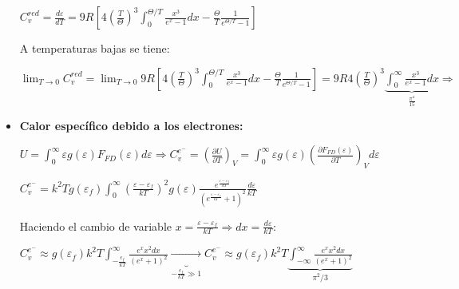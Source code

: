 \documentclass[oneside]{book}
\numberwithin{equation}{section}
\numberwithin{figure}{section}
\numberwithin{table}{section}
\begin{document}
\begin{itemize}
				\begin{center}
					$\displaystyle C_v^{red}=\frac{d\varepsilon}{dT}=9R\left[4\left(\frac{T}{\Theta}\right)^3\int_0^{\Theta/T} \frac{x^3}{e^x-1}dx-\frac{\Theta}{T}\frac{1}{e^{\Theta/T}-1}\right]$
				\end{center}
		
				A temperaturas bajas se tiene:
			
				\begin{center}
					$\displaystyle \lim_{T \to 0} C_v^{red}=\lim_{T \to 0} 9R\left[4\left(\frac{T}{\Theta}\right)^3\int_0^{\Theta/T} \frac{x^3}{e^x-1}dx-\frac{\Theta}{T}\frac{1}{e^{\Theta/T}-1}\right]=9R4\left(\frac{T}{\Theta}\right)^3 \underbrace{\int_0^{\infty} \frac{x^3}{e^x-1}dx}_{\frac{\pi^4}{15}} \Rightarrow$
				\end{center}
		
				\begin{center}
				\end{center}
		
				\item \textbf{Calor específico debido a los electrones:}\\
				
				\begin{center}
					$\displaystyle U=\int_0^{\infty} \varepsilon g(\varepsilon)F_{FD}(\varepsilon) d\varepsilon \Rightarrow C_v^{e^-}=\left( \frac{\partial U}{\partial T}\right)_V=\int_0^{\infty} \varepsilon g(\varepsilon)\left(\frac{\partial F_{FD}(\varepsilon)}{\partial T}\right)_V d\varepsilon$
				\end{center}
				
				\begin{center}
					$\displaystyle C_v^{e^-}=k^2T g(\varepsilon_f)\int_0^{\infty} \left(\frac{\varepsilon-\varepsilon_f}{kT}\right)^2 g(\varepsilon)\frac{e^{\frac{\varepsilon-\varepsilon_f}{kT}}}{\left(e^{\frac{\varepsilon-\varepsilon_f}{kT}}+1\right)^2} \frac{d\varepsilon}{kT}$
				\end{center}
		
				Haciendo el cambio de variable $x=\frac{\varepsilon-\varepsilon_f}{kT} \Rightarrow dx=\frac{d\varepsilon}{kT}$:
				
				\begin{center}
					$\displaystyle C_v^{e^-} \approx g(\varepsilon_f)k^2T\int_{-\frac{\epsilon_f}{kT}}^{\infty} \frac{e^x x^2 dx}{(e^x+1)^2} \underbrace{\longrightarrow}_{-\frac{\epsilon_f}{kT} \gg 1} C_v^{e^-} \approx g(\varepsilon_f)k^2T\underbrace{\int_{-\infty}^{\infty} \frac{e^x x^2 dx}{(e^x+1)^2}}_{\pi^2/3}$
				\end{center}
			

\end{itemize}
\end{document}
